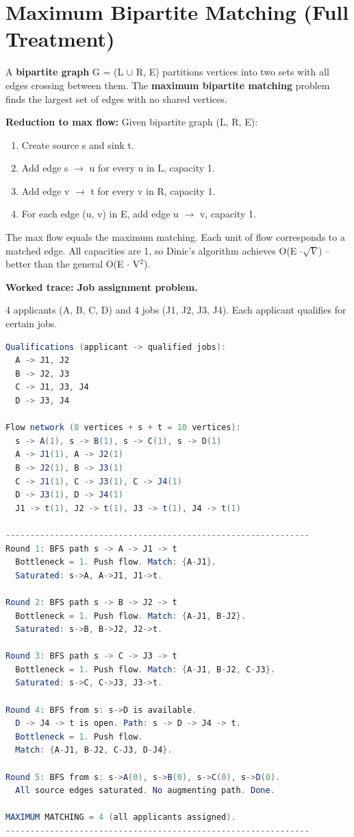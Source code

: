 \section{Maximum Bipartite Matching (Full Treatment)}

A \textbf{bipartite graph} G = (L $\cup$ R, E) partitions vertices into two sets with all edges crossing between them. The \textbf{maximum bipartite matching} problem finds the largest set of edges with no shared vertices.

\textbf{Reduction to max flow:} Given bipartite graph (L, R, E):
\begin{enumerate}
\item Create source s and sink t.
\item Add edge s $\to$ u for every u in L, capacity 1.
\item Add edge v $\to$ t for every v in R, capacity 1.
\item For each edge (u, v) in E, add edge u $\to$ v, capacity 1.
\end{enumerate}
The max flow equals the maximum matching. Each unit of flow corresponds to a matched edge. All capacities are 1, so Dinic's algorithm achieves O(E $\cdot \sqrt{V}$) -- better than the general O(E $\cdot$ V$^{2}$).

\textbf{Worked trace: Job assignment problem.}

4 applicants (A, B, C, D) and 4 jobs (J1, J2, J3, J4). Each applicant qualifies for certain jobs.

\begin{lstlisting}[language=Java]
Qualifications (applicant -> qualified jobs):
  A -> J1, J2
  B -> J2, J3
  C -> J1, J3, J4
  D -> J3, J4

Flow network (8 vertices + s + t = 10 vertices):
  s -> A(1), s -> B(1), s -> C(1), s -> D(1)
  A -> J1(1), A -> J2(1)
  B -> J2(1), B -> J3(1)
  C -> J1(1), C -> J3(1), C -> J4(1)
  D -> J3(1), D -> J4(1)
  J1 -> t(1), J2 -> t(1), J3 -> t(1), J4 -> t(1)

--------------------------------------------------------------
Round 1: BFS path s -> A -> J1 -> t
  Bottleneck = 1. Push flow. Match: {A-J1}.
  Saturated: s->A, A->J1, J1->t.

Round 2: BFS path s -> B -> J2 -> t
  Bottleneck = 1. Push flow. Match: {A-J1, B-J2}.
  Saturated: s->B, B->J2, J2->t.

Round 3: BFS path s -> C -> J3 -> t
  Bottleneck = 1. Push flow. Match: {A-J1, B-J2, C-J3}.
  Saturated: s->C, C->J3, J3->t.

Round 4: BFS from s: s->D is available.
  D -> J4 -> t is open. Path: s -> D -> J4 -> t.
  Bottleneck = 1. Push flow.
  Match: {A-J1, B-J2, C-J3, D-J4}.

Round 5: BFS from s: s->A(0), s->B(0), s->C(0), s->D(0).
  All source edges saturated. No augmenting path. Done.

MAXIMUM MATCHING = 4 (all applicants assigned).
--------------------------------------------------------------
\end{lstlisting}

